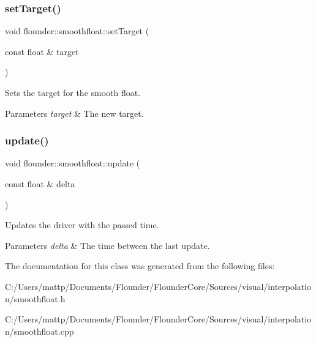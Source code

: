 \subsubsection{\texorpdfstring{set\+Target()}{setTarget()}}
{\footnotesize\ttfamily void flounder\+::smoothfloat\+::set\+Target (\begin{DoxyParamCaption}\item[{const float \&}]{target }\end{DoxyParamCaption})\hspace{0.3cm}{\ttfamily [inline]}}



Sets the target for the smooth float. 


\begin{DoxyParams}{Parameters}
{\em target} & The new target. \\
\hline
\end{DoxyParams}
\mbox{\label{classflounder_1_1smoothfloat_a38b23a64dda6597576401026725dd535}} 
\subsubsection{\texorpdfstring{update()}{update()}}
{\footnotesize\ttfamily void flounder\+::smoothfloat\+::update (\begin{DoxyParamCaption}\item[{const float \&}]{delta }\end{DoxyParamCaption})}



Updates the driver with the passed time. 


\begin{DoxyParams}{Parameters}
{\em delta} & The time between the last update. \\
\hline
\end{DoxyParams}


The documentation for this class was generated from the following files\+:\begin{DoxyCompactItemize}
\item 
C\+:/\+Users/mattp/\+Documents/\+Flounder/\+Flounder\+Core/\+Sources/visual/interpolation/smoothfloat.\+h\item 
C\+:/\+Users/mattp/\+Documents/\+Flounder/\+Flounder\+Core/\+Sources/visual/interpolation/smoothfloat.\+cpp\end{DoxyCompactItemize}

